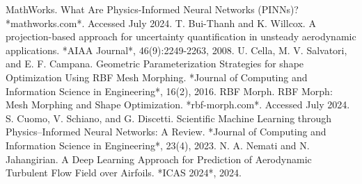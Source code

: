 \documentclass[12pt, a4paper]{report}
\begin{document}
\begin{thebibliography}{99}
     MathWorks. What Are Physics-Informed Neural Networks (PINNs)? *mathworks.com*. Accessed July 2024.
     T. Bui-Thanh and K. Willcox. A projection-based approach for uncertainty quantification in unsteady aerodynamic applications. *AIAA Journal*, 46(9):2249-2263, 2008.
     U. Cella, M. V. Salvatori, and E. F. Campana. Geometric Parameterization Strategies for shape Optimization Using RBF Mesh Morphing. *Journal of Computing and Information Science in Engineering*, 16(2), 2016.
     RBF Morph. RBF Morph: Mesh Morphing and Shape Optimization. *rbf-morph.com*. Accessed July 2024.
     S. Cuomo, V. Schiano, and G. Discetti. Scientific Machine Learning through Physics–Informed Neural Networks: A Review. *Journal of Computing and Information Science in Engineering*, 23(4), 2023.
     N. A. Nemati and N. Jahangirian. A Deep Learning Approach for Prediction of Aerodynamic Turbulent Flow Field over Airfoils. *ICAS 2024*, 2024.
\end{thebibliography}
\end{document}
